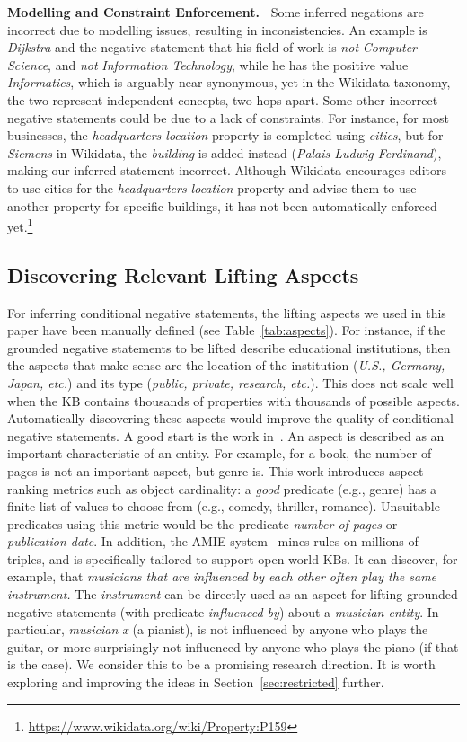 \noindent
\textbf{Modelling and Constraint Enforcement.\ } 
Some inferred negations are incorrect due to modelling issues, resulting in inconsistencies. An example is \textit{Dijkstra} and the negative statement that his field of work is \textit{not} \textit{Computer Science}, and \textit{not} \textit{Information Technology}, while he has the positive value \textit{Informatics}, which is arguably near-synonymous, yet in the Wikidata taxonomy, the two represent independent concepts, two hops apart. Some other incorrect negative statements could be due to a lack of constraints. For instance, for most businesses, the \textit{headquarters location} property is completed using \textit{cities}, but for \textit{Siemens} in Wikidata, the \textit{building} is added instead (\textit{Palais Ludwig Ferdinand}), making our inferred statement  incorrect. Although Wikidata encourages editors to use cities for the  \textit{headquarters location} property and advise them to use another property for specific buildings, it has not been automatically enforced yet.\footnote{\url{https://www.wikidata.org/wiki/Property:P159}}

\subsection{Discovering Relevant Lifting Aspects}
For inferring conditional negative statements, the lifting aspects we used in this paper have been manually defined (see Table~\ref{tab:aspects}). For instance, if the grounded negative statements to be lifted describe educational institutions, then the aspects that make sense are the location of the institution (\textit{U.S., Germany, Japan, etc.}) and its type (\textit{public, private, research, etc.}). This 
does not scale well when the KB contains thousands of properties with thousands of possible aspects. Automatically discovering these aspects would improve the quality of conditional negative statements. A good start is the work in~\cite{oren2006extending}. 
An aspect is described as an important characteristic of an entity. For example, for a book, the number of pages is not an important aspect, but genre is.
This work introduces aspect ranking metrics such as object cardinality: a \textit{good} predicate (e.g., genre) has a finite list of values to choose from (e.g., comedy, thriller, romance). Unsuitable predicates using this metric would be the predicate \textit{number of pages} or \textit{publication date}. In addition, the AMIE system~\cite{AMIE,AMIEP} mines rules on millions of triples, and is specifically tailored to support open-world KBs. It can discover, for example, that \textit{musicians that are influenced by each other often play the same instrument.} The \textit{instrument} can be directly used as an aspect for lifting grounded negative statements (with predicate \textit{influenced by}) about a \textit{musician-entity}. In particular, \textit{musician x} (a pianist), is not influenced by anyone who plays the guitar, or more surprisingly not influenced by anyone who plays the piano (if that is the case). We consider this to be a promising research direction. It is worth exploring and improving the ideas in Section~\ref{sec:restricted} further.%

